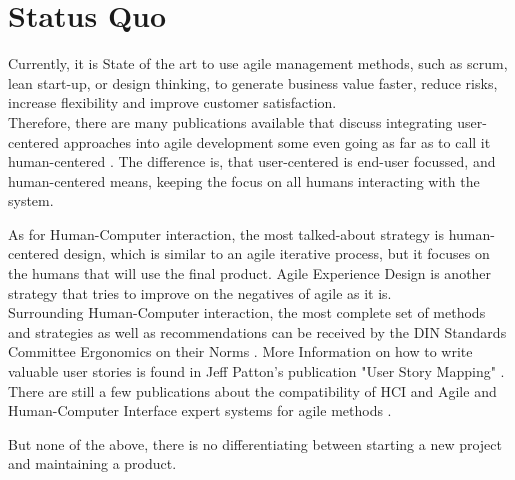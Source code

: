 \section*{Status Quo}

Currently, it is State of the art to use agile management methods, such as scrum, lean start-up, or design thinking, to generate business value faster, reduce risks, increase flexibility and improve customer satisfaction. \\
Therefore, there are many publications available that discuss integrating user-centered approaches into agile development \citep{PDFAnAgi97:online, HowtoCom22:online} some even going as far as to call it human-centered \citep{Bringing7:online, HumanCen72:online, Forbrig2015ManagingTA, Agilehum49:online}. The difference is, that user-centered is end-user focussed, and human-centered means, keeping the focus on all humans interacting with the system.

As for Human-Computer interaction, the most talked-about strategy is human-centered design, which is similar to an agile iterative process, but it focuses on the humans that will use the final product. Agile Experience Design \citep{ratcliffe2011agile:main} is another strategy that tries to improve on the negatives of agile as it is. \\
Surrounding Human-Computer interaction, the most complete set of methods and strategies as well as recommendations can be received by the DIN Standards Committee Ergonomics on their Norms \citep{dinEnIso9241:110, dinEnIso9241:210, dinEnIso9241:220}. More Information on how to write valuable user stories is found in Jeff Patton's publication "User Story Mapping" \citep{pattonUserStory}. There are still a few publications about the compatibility of HCI and Agile \citep{HumanCom2:online} and Human-Computer Interface expert systems for agile methods \citep{Humancom0:online}.

But none of the above, there is no differentiating between starting a new project and maintaining a product. 